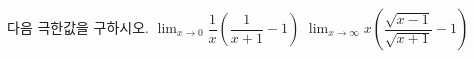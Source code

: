 다음 극한값을 구하시오.
 $\displaystyle\lim_{x\to 0}\dfrac{1}{x}\left(\dfrac{1}{x+1}-1\right)$
 $\displaystyle\lim_{x\to\infty} x\left(\dfrac{\sqrt{x-1}}{\sqrt{x+1}}-1\right)$
